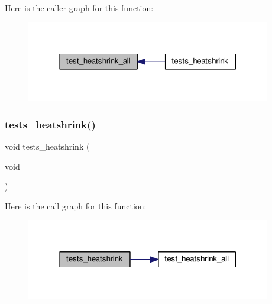 Here is the caller graph for this function\+:
\nopagebreak
\begin{figure}[H]
\begin{center}
\leavevmode
\includegraphics[width=303pt]{tests-heatshrink_8c_ab5b9c302d03ce463b667fdca371b9969_icgraph}
\end{center}
\end{figure}
\mbox{\label{tests-heatshrink_8c_a29eabd0b9fb6ebb88a9b28bff9d36234}} 
\subsubsection{\texorpdfstring{tests\+\_\+heatshrink()}{tests\_heatshrink()}}
{\footnotesize\ttfamily void tests\+\_\+heatshrink (\begin{DoxyParamCaption}\item[{void}]{ }\end{DoxyParamCaption})}

Here is the call graph for this function\+:
\nopagebreak
\begin{figure}[H]
\begin{center}
\leavevmode
\includegraphics[width=303pt]{tests-heatshrink_8c_a29eabd0b9fb6ebb88a9b28bff9d36234_cgraph}
\end{center}
\end{figure}
